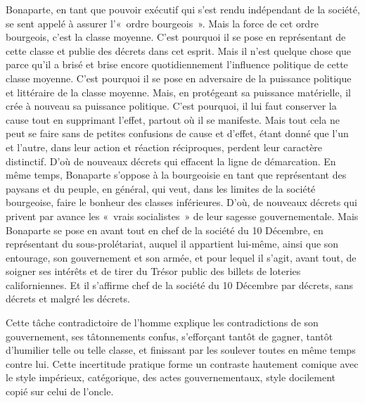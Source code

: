 \documentclass[french,twoside]{book} %
\begin{document}
Bonaparte, en tant que pouvoir exécutif qui s’est rendu indépendant de la société, se sent appelé à assurer l’« ordre bourgeois ». Mais la force de cet ordre bourgeois, c’est la classe moyenne. C’est pourquoi il se pose en représentant de cette classe et publie des décrets dans cet esprit. Mais il n’est quelque chose que parce qu’il a brisé et brise encore quotidiennement l’influence politique de cette classe moyenne. C’est pourquoi il se pose en adversaire de la puissance politique et littéraire de la classe moyenne. Mais, en protégeant sa puissance matérielle, il crée à nouveau sa puissance politique. C’est pourquoi, il lui faut conserver la cause tout en supprimant l’effet, partout où il se manifeste. Mais tout cela ne peut se faire sans de petites confusions de cause et d’effet, étant donné que l’un et l’autre, dans leur action et réaction réciproques, perdent leur caractère distinctif. D’où de nouveaux décrets qui effacent la ligne de démarcation. En même temps, Bonaparte s’oppose à la bourgeoisie en tant que représentant des paysans et du peuple, en général, qui veut, dans les limites de la société bourgeoise, faire le bonheur des classes inférieures. D’où, de nouveaux décrets qui privent par avance les « vrais socialistes » de leur sagesse gouvernementale. Mais Bonaparte se pose en avant tout en chef de la société du 10 Décembre, en représentant du sous-prolétariat, auquel il appartient lui-même, ainsi que son entourage, son gouvernement et son armée, et pour lequel il s’agit, avant tout, de soigner ses intérêts et de tirer du Trésor public des billets de loteries californiennes. Et il s’affirme chef de la société du 10 Décembre par décrets, sans décrets et malgré les décrets.\par
Cette tâche contradictoire de l’homme explique les contradictions de son gouvernement, ses tâtonnements confus, s’efforçant tantôt de gagner, tantôt d’humilier telle ou telle classe, et finissant par les soulever toutes en même temps contre lui. Cette incertitude pratique forme un contraste hautement comique avec le style impérieux, catégorique, des actes gouvernementaux, style docilement copié sur celui de l’oncle.\par
\end{document}
